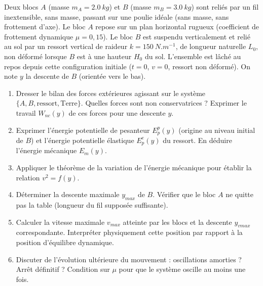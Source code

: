 \documentclass[11pt]{article}
\begin{document}
\begin{exercice}
Deux blocs $A$ (masse $m_A = \SI{2,0}{kg}$) et $B$ (masse $m_B = \SI{3,0}{kg}$) sont reliés par un fil inextensible, sans masse, passant sur une poulie idéale (sans masse, sans frottement d'axe). Le bloc $A$ repose sur un plan horizontal rugueux (coefficient de frottement dynamique $\mu = 0,15$). Le bloc $B$ est suspendu verticalement et relié au sol par un ressort vertical de raideur $k = \SI{150}{N.m^{-1}}$, de longueur naturelle $L_0$, non déformé lorsque $B$ est à une hauteur $H_0$ du sol. L'ensemble est lâché au repos depuis cette configuration initiale ($t=0$, $v=0$, ressort non déformé). On note $y$ la descente de $B$ (orientée vers le bas).
\begin{enumerate}
    \item Dresser le bilan des forces extérieures agissant sur le système $\{A, B, \text{ressort}, \text{Terre}\}$. Quelles forces sont non conservatrices ? Exprimer le travail $W_{nc}(y)$ de ces forces pour une descente $y$.
    \item Exprimer l'énergie potentielle de pesanteur $E_p^p(y)$ (origine au niveau initial de $B$) et l'énergie potentielle élastique $E_p^e(y)$ du ressort. En déduire l'énergie mécanique $E_m(y)$.
    \item Appliquer le théorème de la variation de l'énergie mécanique pour établir la relation $v^2 = f(y)$.
    \item Déterminer la descente maximale $y_{max}$ de $B$. Vérifier que le bloc $A$ ne quitte pas la table (longueur du fil supposée suffisante).
    \item Calculer la vitesse maximale $v_{max}$ atteinte par les blocs et la descente $y_{vmax}$ correspondante. Interpréter physiquement cette position par rapport à la position d'équilibre dynamique.
    \item Discuter de l'évolution ultérieure du mouvement : oscillations amorties ? Arrêt définitif ? Condition sur $\mu$ pour que le système oscille au moins une fois.
\end{enumerate}
\end{exercice}
\end{document}

